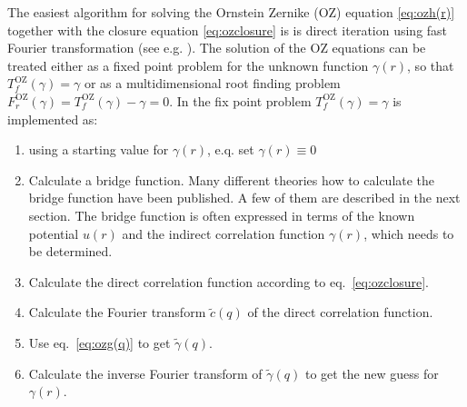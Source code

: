 The easiest algorithm for solving the Ornstein Zernike (OZ) equation \ref{eq:ozh(r)} together with the closure equation \ref{eq:ozclosure} is is direct iteration using fast Fourier transformation (see e.g. \cite{Homeier1995}). The solution of the OZ equations can be treated either as a fixed point problem for the unknown function $\gamma(r)$, so that $T^\mathrm{OZ}_f(\gamma)=\gamma$ or as a multidimensional root finding problem $F^\mathrm{OZ}_r(\gamma)=T^\mathrm{OZ}_f(\gamma)-\gamma=0$. In \SASfit the fix point problem $T^\mathrm{OZ}_f(\gamma)=\gamma$ is implemented as:
\begin{enumerate}
\item using a starting value for $\gamma(r)$, e.q. set $\gamma(r)\equiv 0$
\item Calculate a bridge function. Many different theories how to calculate the bridge function have been published. A few of them are described in the next section. The bridge function is often expressed in terms of the known potential $u(r)$ and the indirect correlation function $\gamma(r)$, which needs to be determined.
\item Calculate the direct correlation function according to eq.\ \ref{eq:ozclosure}.
\item Calculate the Fourier transform $\tilde{c}(q)$ of the direct correlation function.
\item Use eq.\ \ref{eq:ozg(q)} to get $\tilde{\gamma}(q)$.
\item Calculate the inverse Fourier transform of $\tilde{\gamma}(q)$ to get the new guess for $\gamma(r)$.
\end{enumerate}
